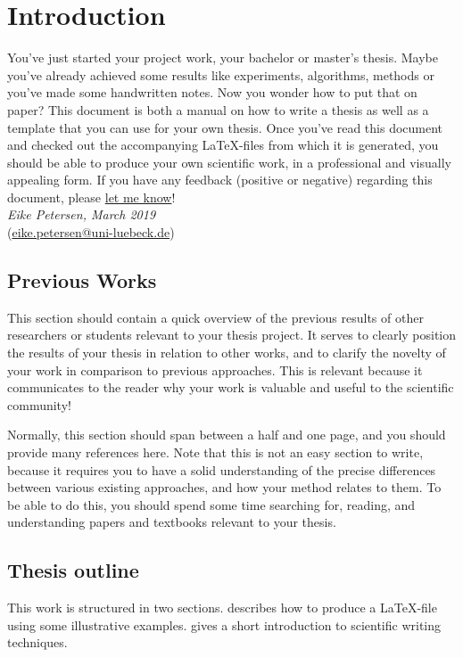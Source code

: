 \chapter{Introduction}
\label{chap:intro}

You've just started your project work, your bachelor or master's thesis. 
Maybe you've already achieved some results like experiments, algorithms, methods or you've made some handwritten notes. 
Now you wonder how to put that on paper?
This document is both a manual on how to write a thesis as well as a template that you can use for your own thesis.
Once you've read this document and checked out the accompanying \LaTeX-files from which it is generated, you should be able to produce your own scientific work, in a professional and visually appealing form.
If you have any feedback (positive or negative) regarding this document, please \href{mailto:eike.petersen@uni-luebeck.de}{let me know}!
\\

\noindent\emph{Eike Petersen, March 2019}\\
\noindent(\href{mailto:eike.petersen@uni-luebeck.de}{eike.petersen@uni-luebeck.de})


\section{Previous Works}
This section should contain a quick overview of the previous results of other researchers or students relevant to your thesis project.
It serves to clearly position the results of your thesis in relation to other works, and to clarify the novelty of your work in comparison to previous approaches.
This is relevant because it communicates to the reader why your work is valuable and useful to the scientific community!

Normally, this section should span between a half and one page, and you should provide many references here.
Note that this is not an easy section to write, because it requires you to have a solid understanding of the precise differences between various existing approaches, and how your method relates to them.
To be able to do this, you should spend some time searching for, reading, and understanding papers and textbooks relevant to your thesis.

\section{Thesis outline}
This work is structured in two sections. 
 describes how to produce a \LaTeX-file using some illustrative examples. 
 gives a short introduction to scientific writing techniques.


